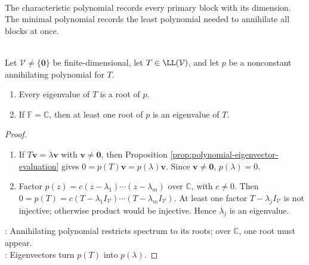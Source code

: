 \begin{perspective} \label{per:characteristic-versus-minimal-polynomial} \\
The characteristic polynomial records every primary block with its dimension. The minimal polynomial records the least polynomial needed to annihilate all blocks at once.
\end{perspective}

\begin{theorem} \label{thm:annihilating-polynomials-control-spectrum} \\
Let $\mathcal{V}\neq\{\mathbf{0}\}$ be finite-dimensional, let $T\in\LL(\mathcal{V})$, and let $p$ be a nonconstant annihilating polynomial for $T$.
\begin{enumerate}[label=(\roman*)]
\setlength{\itemsep}{0pt}
\item Every eigenvalue of $T$ is a root of $p$.
\item If $\mathbb{F}=\mathbb{C}$, then at least one root of $p$ is an eigenvalue of $T$.
\end{enumerate}
\begin{proof}
\begin{enumerate}[label=(\roman*)]
\setlength{\itemsep}{0pt}
\item If $T\mathbf{v}=\lambda\mathbf{v}$ with $\mathbf{v}\neq\mathbf{0}$, then Proposition \ref{prop:polynomial-eigenvector-evaluation} gives $0=p(T)\mathbf{v}=p(\lambda)\mathbf{v}$. Since $\mathbf{v}\neq\mathbf{0}$, $p(\lambda)=0$.
\item Factor $p(z)=c(z-\lambda_1)\cdots(z-\lambda_m)$ over $\mathbb{C}$, with $c\neq0$. Then $0=p(T)=c(T-\lambda_1I_{\mathcal{V}})\cdots(T-\lambda_mI_{\mathcal{V}})$. At least one factor $T-\lambda_jI_{\mathcal{V}}$ is not injective; otherwise product would be injective. Hence $\lambda_j$ is an eigenvalue.
\end{enumerate}
: Annihilating polynomial restricts spectrum to its roots; over $\mathbb{C}$, one root must appear.\\
: Eigenvectors turn $p(T)$ into $p(\lambda)$.
\end{proof}
\end{theorem}


